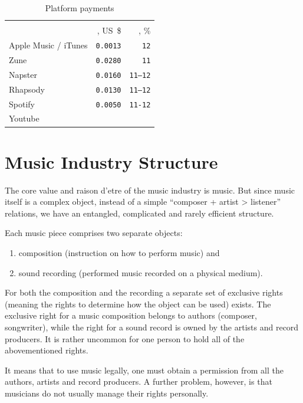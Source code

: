 \documentclass[12pt]{report}
\begin{document}
\begin{table}[H]
\centering
\caption{Platform payments}
\begin{tabular}{lrr}
\toprule
	& \multicolumn{2}{c}{\textbf{\PayPlay}} \\
	\textbf{\Platform} & 
	\textbf{\LabelPartion}, US~\$ &
	\textbf{\ArtistPartion}, \% \\
\bottomrule
\midrule
Apple Music / iTunes		& \texttt{0.0013} 	& \texttt{12} \\
Zune								& \texttt{0.0280} 	& \texttt{11} \\
Napster						& \texttt{0.0160} 	& \texttt{11–12} \\
Rhapsody						& \texttt{0.0130} 	& \texttt{11–12} \\
Spotify							& \texttt{0.0050} 	& \texttt{11-12} \\
Youtube 						& \multicolumn{2}{p{0.55\linewidth}}{\YoutubePay} \\
\bottomrule
\end{tabular}
\end{table}


\vfill\null\pagebreak
\section{Music Industry Structure}
\label{industry-structure}
The core value and raison d’etre of the music industry is music. But since music itself is a complex object, instead of a simple “composer + artist > listener” relations, we have an entangled, complicated and rarely efficient structure.

Each music piece comprises two separate objects:
\begin{enumerate}
	\item composition (instruction on how to perform music) and
	\item sound recording (performed music recorded on a physical medium).
\end{enumerate}

For both the composition and the recording a separate set of exclusive rights (meaning the rights to determine how the object can be used) exists. The exclusive right for a music composition belongs to authors (composer, songwriter), while the right for a sound record is owned by the artists and record producers. It is rather uncommon for one person to hold all of the abovementioned rights.

It means that to use music legally, one must obtain a permission from all the authors, artists and record producers. A further problem, however, is that musicians do not usually manage their rights personally.
\end{document}
